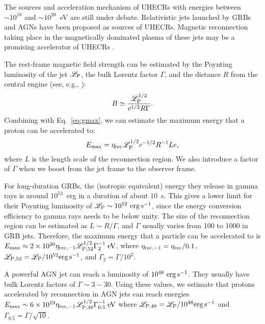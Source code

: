 \documentclass[twocolumn,twocolappendix]{aastex63}
\begin{document}
The sources and acceleration mechanism of UHECRs with energies between $\sim 10^{18}$ and $\sim10^{20}$~eV are still under debate. Relativistic jets launched by GRBs \citep{milgrom_1995, waxman_1995} and AGNs \citep{halzen_02} have been proposed as sources of UHECRs. Magnetic reconnection  taking place in the magnetically dominated plasma of these jets may be a promising accelerator of UHECRs \citep{giannios_10}.

The rest-frame magnetic field strength can be estimated by the Poynting luminosity of the jet $\mathscr{L}_{\rm P}$, the bulk Lorentz factor $\Gamma$, and the distance $R$ from the central engine (see, e.g., \citet{giannios_10}):
\begin{equation}
B\simeq \frac{\mathscr{L}_{\rm P}^{1/2}}{c^{1/2}R\Gamma}.
\end{equation}
Combining with Eq.~\ref{eq:gmax}, we can estimate the maximum energy that a proton can be accelerated to:
\begin{equation}
	E_{\rm max} = \eta_{\rm rec}  \mathscr{L}_{\rm P}^{1/2} c^{-1/2} R^{-1} L e,
\end{equation}
where $L$ is the length scale of the reconnection region. We also introduce a factor of $\Gamma$ when we boost from the jet frame to the observer frame.

For long-duration GRBs, the (isotropic equivalent) energy they release in gamma rays is around $10^{53}$~erg in a duration of about $10$~s. This gives a lower limit for their Poynting luminosity  of $\mathscr{L}_{\rm P}\sim 10^{52}~{\rm erg\,s^{-1}}$, since the energy conversion efficiency to gamma rays needs to be below unity. The size of the reconnection region can be estimated as $L\sim R/\Gamma$, and $\Gamma$ usually varies from 100 to 1000 in GRB jets. Therefore, the maximum energy that a particle can be accelerated to is $E_{\rm max} \approx 2\times 10 ^{20} \eta_{\rm rec,-1}\mathscr{L}_{\rm P, 52}^{1/2} \Gamma_2^{-1} {\;\rm eV}$, where $\eta_{\rm rec,-1} = \eta_{\rm rec}/0.1$, $\mathscr{L}_{\rm P, 52} = \mathscr{L}_{\rm P}/10^{52}{\rm erg \,s^{-1}}$, and $\Gamma_2 = \Gamma/10^2$.

A powerful AGN jet can reach a luminosity of $10^{48}~{\rm erg\,s^{-1}}$. They usually have bulk Lorentz factors of  $\Gamma \sim 3-30$. Using these values, we estimate that protons accelerated by reconnection in AGN jets can reach energies $E_{\rm max}\sim 6\times10^{19} \eta_{\rm rec,-1}\mathscr{L}_{\rm P, 48}^{1/2} \Gamma_{0.5}^{-1} {\;\rm eV}$ where $\mathscr{L}_{\rm P, 48} = \mathscr{L}_{\rm P}/10^{48}{\rm erg\,s^{-1}}$ and $\Gamma_{0.5} = \Gamma/\sqrt{10}$.
\end{document}
